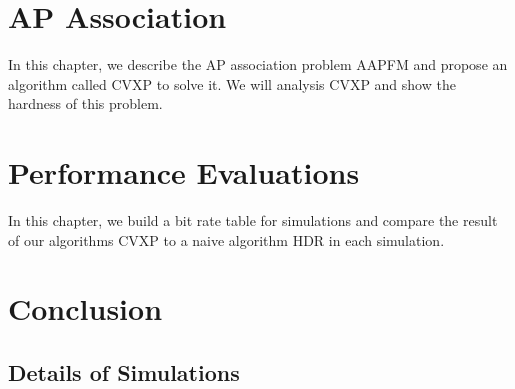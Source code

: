 \documentclass[a4paper, 12pt]{report}
\begin{document}
	\chapter{AP Association}
		In this chapter, we describe the AP association problem AAPFM and propose an algorithm called CVXP to solve it. We will analysis CVXP and show the hardness of this problem.
		
		
		
	\chapter{Performance Evaluations}
		In this chapter, we build a bit rate table for simulations and compare the result of our algorithms CVXP to a naive algorithm HDR in each simulation.
		
%		
		
	\chapter{Conclusion}
		
%	
	
	
	\begin{appendices}
		\chapter{Details of Simulations}
		\label{apendix:dos}
		
	\end{appendices}
\end{document}
